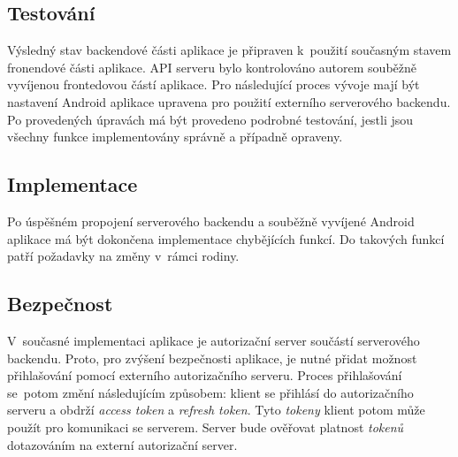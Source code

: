     \subsection{Testování}
        Výsledný stav backendové části aplikace je připraven k~použití současným stavem fronendové části aplikace. API serveru bylo kontrolováno autorem souběžně vyvíjenou frontedovou částí aplikace. Pro následující proces vývoje mají být nastavení Android aplikace upravena pro použití externího serverového backendu. Po provedených úpravách má být provedeno podrobné testování, jestli jsou všechny funkce implementovány správně a případně opraveny.
    
    \subsection{Implementace}
        Po úspěšném propojení serverového backendu a souběžně vyvíjené Android aplikace má být dokončena implementace chybějících funkcí. Do takových funkcí patří požadavky na změny v~rámci rodiny. 
        
    \subsection{Bezpečnost}
        V~současné implementaci aplikace je autorizační server součástí serverového backendu. Proto, pro zvýšení bezpečnosti aplikace, je nutné přidat možnost přihlašování pomocí externího autorizačního serveru. Proces přihlašování se~potom změní následujícím způsobem: klient se přihlásí do autorizačního serveru a obdrží \textit{access token} a \textit{refresh token}. 
        Tyto \textit{tokeny} klient potom může použít pro komunikaci se serverem. Server bude ověřovat platnost \textit{tokenů} dotazováním na externí autorizační server.
